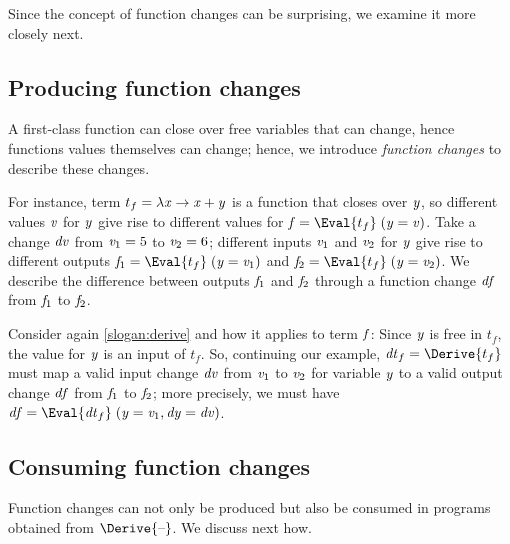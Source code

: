 Since the concept of function changes can be surprising, we examine it more
closely next.

\subsection{Producing function changes}

A first-class function can close over free variables that can
change, hence functions values themselves can change; hence, we
introduce \emph{function changes} to describe these changes.


For instance, term \ensuremath{t_f\mathrel{=}\lambda \Varid{x}\to \Varid{x}\mathbin{+}\Varid{y}} is a function that closes
over \ensuremath{\Varid{y}}, so different values \ensuremath{\Varid{v}} for \ensuremath{\Varid{y}} give rise to different
values for \ensuremath{\Varid{f}\mathrel{=}\Eval{t_f}\;(\Varid{y}\mathrel{=}\Varid{v})}. Take a change \ensuremath{\Varid{dv}} from \ensuremath{\Varid{v}_{1}\mathrel{=}\mathrm{5}} to \ensuremath{\Varid{v}_{2}\mathrel{=}\mathrm{6}}; different inputs \ensuremath{\Varid{v}_{1}} and \ensuremath{\Varid{v}_{2}} for \ensuremath{\Varid{y}} give
rise to different outputs \ensuremath{\Varid{f}_{1}\mathrel{=}\Eval{t_f}\;(\Varid{y}\mathrel{=}\Varid{v}_{1})} and \ensuremath{\Varid{f}_{2}\mathrel{=}\Eval{t_f}\;(\Varid{y}\mathrel{=}\Varid{v}_{2})}.
%
We describe the difference between outputs \ensuremath{\Varid{f}_{1}} and \ensuremath{\Varid{f}_{2}} through a function
change \ensuremath{\Varid{df}} from \ensuremath{\Varid{f}_{1}} to \ensuremath{\Varid{f}_{2}}.

Consider again \cref{slogan:derive} and how it applies to term
\ensuremath{\Varid{f}}:
%
\sloganDerive*
%
Since \ensuremath{\Varid{y}} is free in \ensuremath{t_f}, the value for \ensuremath{\Varid{y}} is an input of
\ensuremath{t_f}. So, continuing our example, \ensuremath{\Varid{dt}_f\mathrel{=}\Derive{t_f}} must map
a valid input change \ensuremath{\Varid{dv}} from \ensuremath{\Varid{v}_{1}} to \ensuremath{\Varid{v}_{2}} for variable \ensuremath{\Varid{y}} to
a valid output change \ensuremath{\Varid{df}} from \ensuremath{\Varid{f}_{1}} to \ensuremath{\Varid{f}_{2}}; more precisely, we must
have \ensuremath{\Varid{df}\mathrel{=}\Eval{\Varid{dt}_f}\;(\Varid{y}\mathrel{=}\Varid{v}_{1},\Varid{dy}\mathrel{=}\Varid{dv})}.

\subsection{Consuming function changes}
Function changes can not only be produced but also be consumed in
programs obtained from \ensuremath{\Derive{\text{\textendash}}}. We discuss next how.


